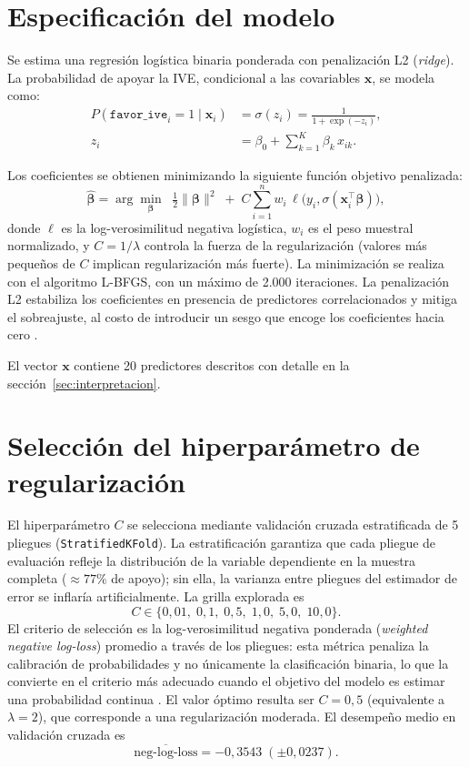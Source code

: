 \documentclass[11pt,a4paper]{article}
\begin{document}
\section{Especificación del modelo}

Se estima una regresión logística binaria ponderada con penalización L2 (\emph{ridge}). La probabilidad de apoyar la IVE, condicional a las covariables $\mathbf{x}$, se modela como:
\begin{align}
P(\texttt{favor\_ive}_i = 1 \mid \mathbf{x}_i) &= \sigma(z_i) = \frac{1}{1 + \exp(-z_i)}, \\
z_i &= \beta_0 + \sum_{k=1}^{K} \beta_k \, x_{ik}.
\end{align}

Los coeficientes se obtienen minimizando la siguiente función objetivo penalizada:
\begin{equation}
\hat{\boldsymbol{\beta}} = \arg\min_{\boldsymbol{\beta}} \;\; \tfrac{1}{2} \lVert \boldsymbol{\beta} \rVert^{2} \;+\; C \sum_{i=1}^{n} w_i \, \ell\bigl(y_i, \sigma(\mathbf{x}_i^{\top} \boldsymbol{\beta})\bigr),
\end{equation}
donde $\ell$ es la log-verosimilitud negativa logística, $w_i$ es el peso muestral normalizado, y $C = 1/\lambda$ controla la fuerza de la regularización (valores más pequeños de $C$ implican regularización más fuerte). La minimización se realiza con el algoritmo L-BFGS, con un máximo de 2.000 iteraciones. La penalización L2 estabiliza los coeficientes en presencia de predictores correlacionados y mitiga el sobreajuste, al costo de introducir un sesgo que encoge los coeficientes hacia cero \cite{LeCessie1992}.

El vector $\mathbf{x}$ contiene 20 predictores descritos con detalle en la sección~\ref{sec:interpretacion}.

\section{Selección del hiperparámetro de regularización}

El hiperparámetro $C$ se selecciona mediante validación cruzada estratificada de 5 pliegues (\texttt{StratifiedKFold}). La estratificación garantiza que cada pliegue de evaluación refleje la distribución de la variable dependiente en la muestra completa (${\approx}77\%$ de apoyo); sin ella, la varianza entre pliegues del estimador de error se inflaría artificialmente. La grilla explorada es
\[
C \in \{0{,}01,\; 0{,}1,\; 0{,}5,\; 1{,}0,\; 5{,}0,\; 10{,}0\}.
\]
El criterio de selección es la log-verosimilitud negativa ponderada (\emph{weighted negative log-loss}) promedio a través de los pliegues: esta métrica penaliza la calibración de probabilidades y no únicamente la clasificación binaria, lo que la convierte en el criterio más adecuado cuando el objetivo del modelo es estimar una probabilidad continua \cite{Kohavi1995}. El valor óptimo resulta ser $C = 0{,}5$ (equivalente a $\lambda = 2$), que corresponde a una regularización moderada. El desempeño medio en validación cruzada es
\[
\overline{\text{neg-log-loss}} = -0{,}3543 \; (\pm 0{,}0237).
\]
\end{document}
